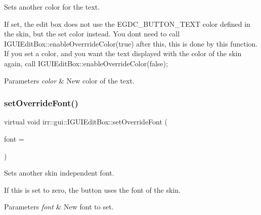 Sets another color for the text. 

If set, the edit box does not use the E\+G\+D\+C\+\_\+\+B\+U\+T\+T\+O\+N\+\_\+\+T\+E\+XT color defined in the skin, but the set color instead. You don\textquotesingle{}t need to call I\+G\+U\+I\+Edit\+Box\+::enable\+Overrride\+Color(true) after this, this is done by this function. If you set a color, and you want the text displayed with the color of the skin again, call I\+G\+U\+I\+Edit\+Box\+::enable\+Override\+Color(false); 
\begin{DoxyParams}{Parameters}
{\em color} & New color of the text. \\
\hline
\end{DoxyParams}
\mbox{\label{classirr_1_1gui_1_1IGUIEditBox_a7608fe327ec860712ec87b5e1dc4aec9}} 
\subsubsection{\texorpdfstring{set\+Override\+Font()}{setOverrideFont()}\hspace{0.1cm}{\footnotesize\ttfamily [1/2]}}
{\footnotesize\ttfamily virtual void irr\+::gui\+::\+I\+G\+U\+I\+Edit\+Box\+::set\+Override\+Font (\begin{DoxyParamCaption}\item[{\hyperlink{classirr_1_1gui_1_1IGUIFont}{I\+G\+U\+I\+Font} $\ast$}]{font = {} }\end{DoxyParamCaption})\hspace{0.3cm}{\ttfamily [pure virtual]}}



Sets another skin independent font. 

If this is set to zero, the button uses the font of the skin. 
\begin{DoxyParams}{Parameters}
{\em font} & New font to set. \\
\hline
\end{DoxyParams}
\mbox{\label{classirr_1_1gui_1_1IGUIEditBox_a7608fe327ec860712ec87b5e1dc4aec9}} 
